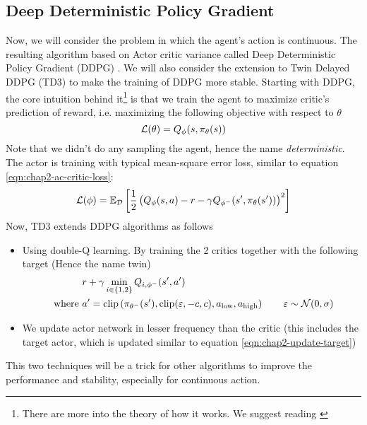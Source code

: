 \subsection{Deep Deterministic Policy Gradient}
\label{sec:chap2-ddpg}
Now, we will consider the problem in which the agent's action is continuous. The resulting algorithm based on Actor critic variance called Deep Deterministic Policy Gradient (DDPG) \cite{lillicrap2015continuous}. We will also consider the extension to Twin Delayed DDPG (TD3) \cite{fujimoto2018addressing} to make the training of DDPG more stable. Starting with DDPG, the core intuition behind it\footnote{There are more into the theory of how it works. We suggest reading \cite{silver2014deterministic}} is that we train the agent to maximize critic's prediction of reward, i.e. maximizing the following objective with respect to $\theta$
\begin{equation}
    \mathcal{L}(\theta) = Q_\phi(s, \pi_\theta(s))
\end{equation}
Note that we didn't do any sampling the agent, hence the name \textit{deterministic}.  The actor is training with typical mean-square error loss, similar to equation \ref{eqn:chap2-ac-critic-loss}:
\begin{equation}
    \mathcal{L}(\phi) = \mathbb{E}_{\mathcal{D}}\left[ \frac{1}{2}\left( Q_\phi(s, a) - r - \gamma Q_{\phi^-}(s', \pi_\theta(s')) \right)^2 \right]
\end{equation}
Now, TD3 extends DDPG algorithms as follows
\begin{itemize}
    \item Using double-Q learning. By training the 2 critics together with the following target (Hence the name twin)
    \begin{equation}
    \begin{aligned}
        &r + \gamma \min_{i \in \left\{ 1, 2 \right\}} Q_{i, \phi^-}(s', a') \\
        \text{ where }& a' = \text{clip}\left( \pi_{\theta^-}(s'), \text{clip}(\varepsilon, -c, c), a_\text{low}, a_\text{high} \right) \qquad \varepsilon \sim \mathcal{N}(0, \sigma)
    \end{aligned}
    \end{equation}
    \item We update actor network in lesser frequency than the critic (this includes the target actor, which is updated similar to equation \ref{eqn:chap2-update-target})
\end{itemize}
This two techniques will be a trick for other algorithms to improve the performance and stability, especially for continuous action.